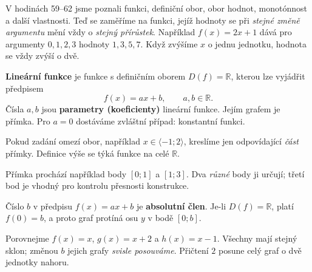 \documentclass[11pt,a4paper]{article}
\begin{document}

V hodinách 59–62 jsme poznali funkci, definiční obor, obor hodnot, monotónnost a další vlastnosti.
Teď se zaměříme na funkci, jejíž hodnoty se při \emph{stejné změně argumentu} mění vždy o
\emph{stejný přírůstek}. Například $f(x)=2x+1$ dává pro argumenty $0,1,2,3$ hodnoty
$1,3,5,7$. Když zvýšíme $x$ o jednu jednotku, hodnota se vždy zvýší o dvě.

\begin{definiceBox}[title={Definice - Lineární funkce}]
\textbf{Lineární funkce} je funkce s definičním oborem $D(f)=\mathbb R$, kterou lze vyjádřit předpisem
\[
  f(x)=ax+b,\qquad a,b\in\mathbb R.
\]
Čísla $a,b$ jsou \textbf{parametry (koeficienty)} lineární funkce.
Jejím grafem je přímka. Pro $a=0$ dostáváme zvláštní případ: konstantní funkci.
\end{definiceBox}

Pokud zadání omezí obor, například $x\in\langle-1;2\rangle$, kreslíme jen odpovídající
\emph{část} přímky. Definice výše se týká funkce na celé $\mathbb R$.

\begin{center}
\end{center}
Přímka prochází například body $[0;1]$ a $[1;3]$. Dva \emph{různé} body ji určují;
třetí bod je vhodný pro kontrolu přesnosti konstrukce.

\begin{definiceBox}[title={Definice - Absolutní člen lineární funkce}]
Číslo $b$ v předpisu $f(x)=ax+b$ je \textbf{absolutní člen}. Je-li $D(f)=\mathbb R$,
platí $f(0)=b$, a proto graf protíná osu $y$ v bodě $[0;b]$.
\end{definiceBox}
Porovnejme $f(x)=x$, $g(x)=x+2$ a $h(x)=x-1$. Všechny mají stejný sklon;
změnou $b$ jejich grafy \emph{svisle posouváme}. Přičtení $2$ posune celý graf o dvě jednotky nahoru.
\end{document}
